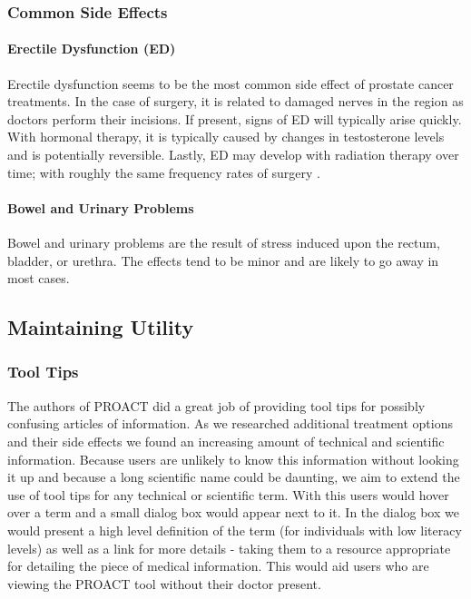 \documentclass[journal]{vgtc}                %
\begin{document}
                \subsubsection{Common Side Effects}
                        \paragraph{Erectile Dysfunction (ED)}
                                Erectile dysfunction seems to be the most common side effect of prostate cancer treatments.
                                In the case of surgery, it is related to damaged nerves in the region as doctors perform their incisions. If present, signs of ED will typically arise quickly.
                                With hormonal therapy, it is typically caused by changes in testosterone levels and is potentially reversible.
                                Lastly, ED may develop with radiation therapy over time; with roughly the same frequency rates of surgery \cite{RadiationTherapy:2005}.

                        \paragraph{Bowel and Urinary Problems}
                                Bowel and urinary problems are the result of stress induced upon the rectum, bladder, or urethra.
                                The effects tend to be minor and are likely to go away in most cases.


        \subsection{Maintaining Utility}
                \subsubsection{Tool Tips}
                        The authors of PROACT did a great job of providing tool tips for possibly confusing articles of information.
                        As we researched additional treatment options and their side effects we found an increasing amount of technical and scientific information.
                        Because users are unlikely to know this information without looking it up and because a long scientific name could be daunting, we aim to extend the use of tool tips for any technical or scientific term.
                        With this users would hover over a term and a small dialog box would appear next to it.
                        In the dialog box we would present a high level definition of the term (for individuals with low literacy levels) as well as a link for more details - taking them to a resource appropriate for detailing the piece of medical information.
                        This would aid users who are viewing the PROACT tool without their doctor present.
\end{document}
